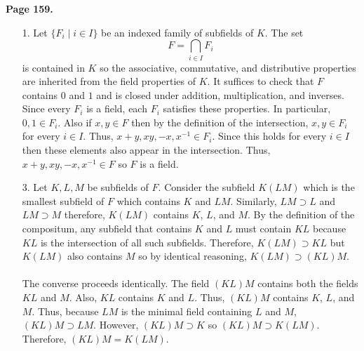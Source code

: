 \documentclass[12pt]{extarticle}
\begin{document}
\textbf{Page 159.} 
\begin{enumerate}
\item[1.] Let $\{F_i \mid i \in I \}$ be an indexed family of subfields of $K$. The set 
\[ F = \bigcap_{i \in I} F_i\] is contained in $K$ so the associative, commutative,  and distributive properties are inherited from the field properties of $K$. It suffices to check that $F$ contains $0$ and $1$ and is closed under addition, multiplication, and inverses. Since every $F_i$ is a field, each $F_i$ satisfies these properties. In particular, $0, 1 \in F_i$. Also if $x, y \in F$ then by the definition of the intersection, $x, y \in F_i$ for every $i \in I$. Thus, $x + y, xy , -x , x^{-1} \in F_i$. Since this holds for every $i \in I$ then these elements also appear in the intersection. Thus, $x + y, xy, -x, x^{-1} \in F$ so $F$ is a field. 

\item[3.] Let $K, L, M$ be subfields of $F$. Consider the subfield $K(LM)$ which is the smallest subfield of $F$ which contains $K$ and $LM$. Similarly, $LM \supset L$ and $LM \supset M$ therefore, $K(LM)$ contains $K$, $L$, and $M$. By the definition of the compositum, any subfield that contains $K$ and $L$ must contain $KL$ because $KL$ is the intersection of all such subfields. Therefore, $K(LM) \supset KL$ but $K(LM)$ also contains $M$ so by identical reasoning, $K(LM) \supset (KL)M$. \\ \\ The converse proceeds identically. The field $(KL)M$ contains both the fields $KL$ and $M$. Also, $KL$ contains $K$ and $L$. Thus, $(KL)M$ contains $K$, $L$, and $M$. Thus, because $LM$ is the minimal field containing $L$ and $M$, $(KL)M \supset LM$. However, $(KL)M \supset K$ so $(KL)M \supset K(LM)$. Therefore, $(KL)M = K(LM)$.        
\end{enumerate}
\end{document}
